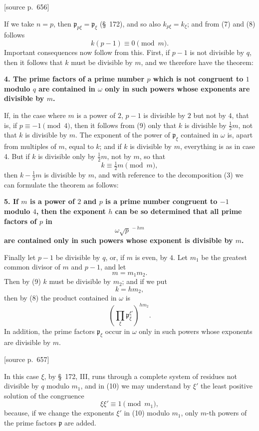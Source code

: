 \documentclass[11pt]{article}
\newcommand{\pp}{\mathfrak p}
\newcommand{\srcpage}[1]{\par\medskip\noindent\textsf{[source p.~#1]}\par\smallskip}
\begin{document}
\srcpage{656}
If we take $n=p$, then $\pp_{p\xi}=\pp_\xi$ (\S~172), and so also $k_{p\xi}=k_\xi$; and from (7) and (8) follows
\begin{equation}
  k(p-1)\equiv0\pmod m.
\tag{9}
\end{equation}
Important consequences now follow from this. First, if $p-1$ is not divisible by $q$, then it follows that $k$ must be divisible by $m$, and we therefore have the theorem:

\textbf{4. The prime factors of a prime number $p$ which is not congruent to $1$ modulo $q$ are contained in $\omega$ only in such powers whose exponents are divisible by $m$.}

If, in the case where $m$ is a power of $2$, $p-1$ is divisible by $2$ but not by $4$, that is, if $p\equiv -1\pmod4$, then it follows from (9) only that $k$ is divisible by $\tfrac12m$, not that $k$ is divisible by $m$. The exponent of the power of $\pp_\xi$ contained in $\omega$ is, apart from multiples of $m$, equal to $k$; and if $k$ is divisible by $m$, everything is as in case 4. But if $k$ is divisible only by $\tfrac12m$, not by $m$, so that
\[
  k\equiv \tfrac12m\pmod m,
\]
then $k-\tfrac12m$ is divisible by $m$, and with reference to the decomposition (3) we can formulate the theorem as follows:

\textbf{5. If $m$ is a power of $2$ and $p$ is a prime number congruent to $-1$ modulo $4$, then the exponent $h$ can be so determined that all prime factors of $p$ in}
\[
  \omega\sqrt{p}^{\,-hm}
\]
\textbf{are contained only in such powers whose exponent is divisible by $m$.}

Finally let $p-1$ be divisible by $q$, or, if $m$ is even, by $4$. Let $m_1$ be the greatest common divisor of $m$ and $p-1$, and let
\[
  m=m_1m_2.
\]
Then by (9) $k$ must be divisible by $m_2$; and if we put
\[
  k=hm_2,
\]
then by (8) the product contained in $\omega$ is
\begin{equation}
  \left(\prod_\xi \pp_\xi^{\xi'}\right)^{hm_2}.
\tag{10}
\end{equation}
In addition, the prime factors $\pp_\xi$ occur in $\omega$ only in such powers whose exponents are divisible by $m$.

\srcpage{657}
In this case $\xi$, by \S~172, III, runs through a complete system of residues not divisible by $q$ modulo $m_1$, and in (10) we may understand by $\xi'$ the least positive solution of the congruence
\[
  \xi\xi'\equiv1\pmod{m_1},
\]
because, if we change the exponents $\xi'$ in (10) modulo $m_1$, only $m$-th powers of the prime factors $\pp$ are added.
\end{document}

